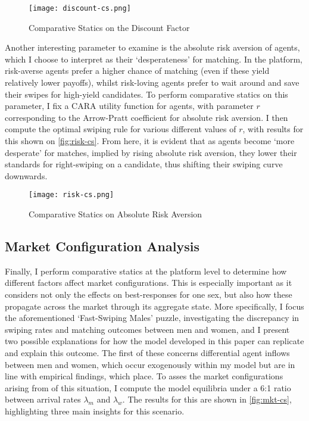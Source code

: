 \begin{figure}[ht] 
    \centering
    \caption{Comparative Statics on the Discount Factor}
    \texttt{[image: discount-cs.png]}
    \label{fig:discount-cs}
\end{figure} 

Another interesting parameter to examine is the absolute risk aversion of agents, which I choose to interpret as their `desperateness' for matching. In the platform, risk-averse agents prefer a higher chance of matching (even if these yield relatively lower payoffs), whilst risk-loving agents prefer to wait around and save their swipes for high-yield candidates. To perform comparative statics on this parameter, I fix a CARA utility function for agents, with parameter $r$ corresponding to the Arrow-Pratt coefficient for absolute risk aversion. I then compute the optimal swiping rule for various different values of $r$, with results for this shown on \autoref{fig:risk-cs}. From here, it is evident that as agents become `more desperate' for matches, implied by rising absolute risk aversion, they lower their standards for right-swiping on a candidate, thus shifting their swiping curve downwards.

\begin{figure}[ht]
    \centering
    \caption{Comparative Statics on Absolute Risk Aversion}
    \texttt{[image: risk-cs.png]}
    \label{fig:risk-cs} 
\end{figure}

\subsection{Market Configuration Analysis}\label{sec:section3.3} 
Finally, I perform comparative statics at the platform level to determine how different factors affect market configurations. This is especially important as it considers not only the effects on best-responses for one sex, but also how these propagate across the market through its aggregate state. More specifically, I focus the aforementioned `Fast-Swiping Males' puzzle, investigating the discrepancy in swiping rates and matching outcomes between men and women, and I present two possible explanations for how the model developed in this paper can replicate and explain this outcome. 
The first of these concerns differential agent inflows between men and women, which occur exogenously within my model but are in line with empirical findings, which place. To asses the market configurations arising from of this situation, I compute the model equilibria under a 6:1 ratio between arrival rates $\lambda_m$ and $\lambda_w$. The results for this are shown in \autoref{fig:mkt-cs}, highlighting three main insights for this scenario. 

